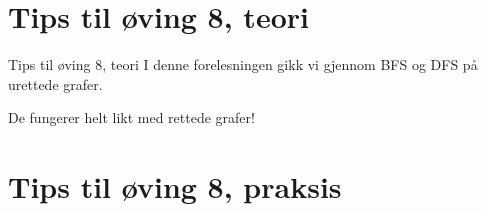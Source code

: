 \documentclass[14pt]{beamer}
\begin{document}
\section{Tips til øving 8, teori}
\begin{frame}{Tips til øving 8, teori}
    I denne forelesningen gikk vi gjennom BFS og DFS på urettede grafer.

    \pause

    De fungerer helt likt med rettede grafer!
\end{frame}

\section{Tips til øving 8, praksis}
\end{document}

